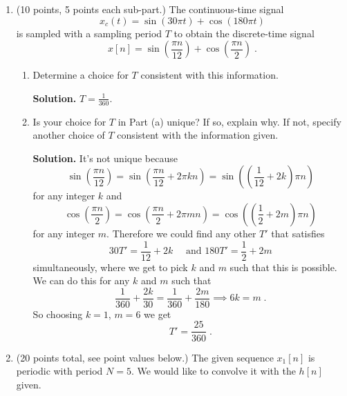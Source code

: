 \documentclass[]{siamltex}
\begin{document}
\newpage
\begin{enumerate}
\item (10 points, 5 points each sub-part.) The continuous-time signal $$x_c(t) = \sin(30 \pi t ) + \cos (180 \pi t)$$ is sampled with a sampling period $T$ to obtain the discrete-time signal $$x[n] = \sin\left(\frac{\pi n}{12}\right) + \cos\left(\frac{\pi n}{2}\right)\;.$$ 

\vspace{5mm} 
\begin{enumerate}
\item Determine a choice for $T$ consistent with this information. 

\vspace{1cm} 
\textbf{Solution.} $T = \frac{1}{360}$.

\vspace{2cm}
\item Is your choice for $T$ in Part (a) unique? If so, explain why. If not, specify another choice of $T$ consistent with the information given.

\vspace{1cm} 
\textbf{Solution.} It's not unique because $$\sin\left(\frac{\pi n}{12}\right) = \sin \left(\frac{\pi n}{12} + 2\pi k n\right) = \sin \left( \left(\frac{1}{12} + 2 k\right) \pi n\right)  $$ for any integer $k$ and 
$$\cos\left(\frac{\pi n}{2}\right) = \cos\left(\frac{\pi n}{2} + 2\pi m n\right) = \cos\left( \left( \frac{1}{2} + 2m\right) \pi n \right)$$ for any integer $m$. Therefore we could find any other $T'$ that satisfies $$30 T' = \frac{1}{12} + 2k \quad \text{ and } 180 T' = \frac{1}{2} + 2m$$ simultaneously, where we get to pick $k$ and $m$ such that this is possible. We can do this for any $k$ and $m$ such that $$\frac{1}{360} + \frac{2k}{30} = \frac{1}{360}+\frac{2m}{180} \implies 6k=m\;.$$ So choosing $k=1$, $m=6$ we get $$T' = \frac{25}{360}\;.$$


\end{enumerate}


\newpage
\item (20 points total, see point values below.) The given sequence $x_1[n]$ is periodic with period $N=5$. We would like to convolve it with the $h[n]$ given. 
\vspace{4mm}


\end{enumerate}
\end{document}
